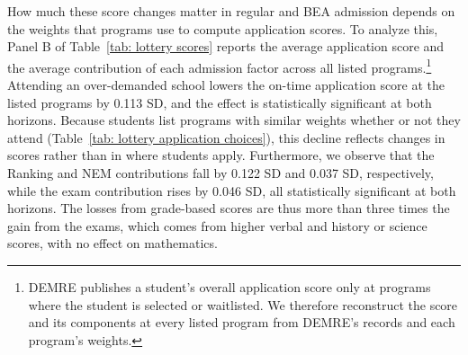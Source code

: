 How much these score changes matter in regular and BEA admission depends on the weights that programs use to compute application scores.  To analyze this, Panel B of Table~\ref{tab: lottery scores} reports the average application score and the average contribution of each admission factor across all listed programs.\footnote{DEMRE publishes a student's overall application score only at programs where the student is selected or waitlisted. We therefore reconstruct the score and its components at every listed program from DEMRE's records and each program's weights.} Attending an over-demanded school lowers the on-time application score at the listed programs by 0.113 SD, and the effect is statistically significant at both horizons. Because students list programs with similar weights whether or not they attend (Table~\ref{tab: lottery application choices}), this decline reflects changes in scores rather than in where students apply. Furthermore, we observe that the Ranking and NEM contributions fall by 0.122 SD and 0.037 SD, respectively, while the exam contribution rises by 0.046 SD, all statistically significant at both horizons. The losses from grade-based scores are thus more than three times the gain from the exams, which comes from higher verbal and history or science scores, with no effect on mathematics.




